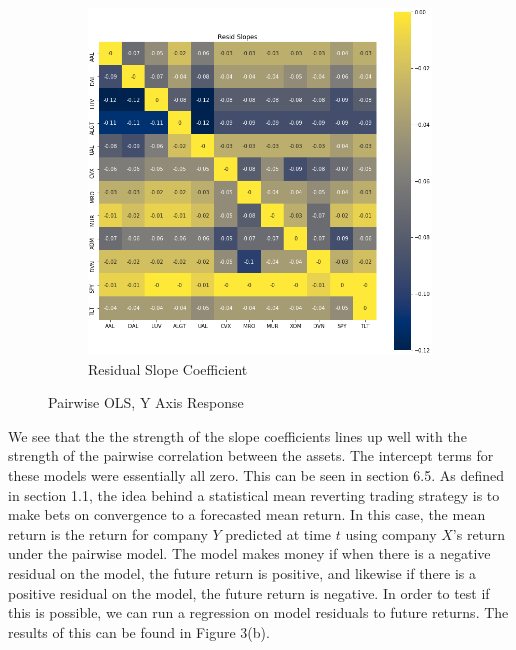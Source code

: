 \documentclass{article}
\begin{document}
\begin{figure}[h!]
\begin{subfigure}{.5\textwidth}
    \includegraphics[width=.95\linewidth]{../Figures/pair_resid_reg_slope.png}
    \caption{Residual Slope Coefficient}
  \end{subfigure}
  \caption{Pairwise OLS, Y Axis Response}
\end{figure}
We see that the the strength of the slope coefficients lines up well with the strength of the
pairwise correlation between the assets. The intercept terms for these models were essentially
all zero. This can be seen in section 6.5. As defined in section 1.1, the idea behind
a statistical mean reverting trading strategy is to make bets on convergence to a forecasted
mean return. In this case, the mean return is the return for company $Y$ predicted 
at time $t$ using company $X$'s return under the pairwise model. The model makes money 
if when there is a negative residual on the model, the future return is positive, and
likewise if there is a positive residual on the model, the future return is negative.
In order to test if this is possible, we can run a regression on model residuals to 
future returns. The results of this can be found in Figure 3(b).
\end{document}
